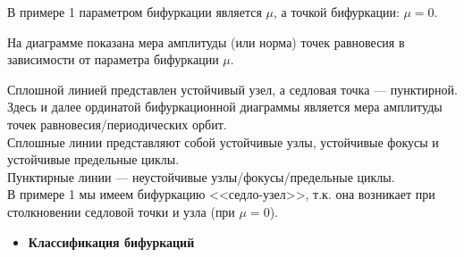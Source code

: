 \begin{nb}
	В примере 1 параметром бифуркации является $\mu$, а точкой бифуркации: $\mu = 0$.
\end{nb}

На диаграмме показана мера амплитуды (или норма) точек равновесия в зависимости от параметра бифуркации $\mu$.
\begin{center}
\end{center}

Сплошной линией представлен устойчивый узел, а седловая точка — пунктирной. Здесь и далее ординатой бифуркационной диаграммы является мера амплитуды точек равновесия/периодических орбит. \\
Сплошные линии представляют собой устойчивые узлы, устойчивые фокусы и устойчивые предельные циклы. \\
Пунктирные линии — неустойчивые узлы/фокусы/предельные циклы. \\
В примере 1 мы имеем бифуркацию <<седло-узел>>, т.к. она возникает при столкновении седловой точки и узла (при $\mu=0$).

\newpage
\begin{itemize}
	\item \colorbox{orange!30}{\textbf{Классификация бифуркаций}}
\end{itemize}

